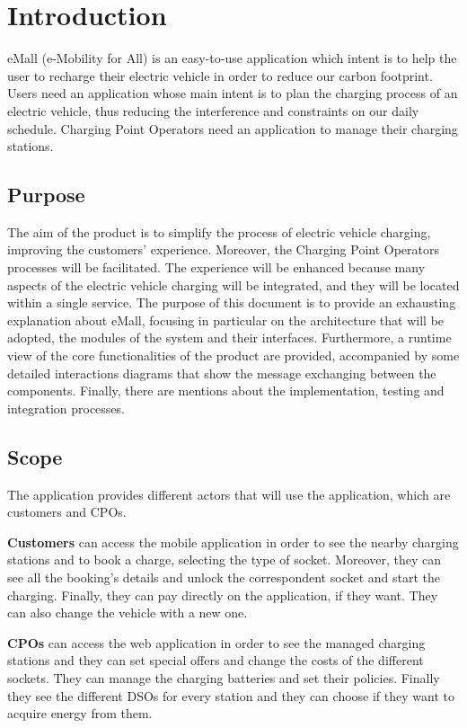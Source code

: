 \section{Introduction}
eMall (e-Mobility for All) is an easy-to-use application which intent is to help the user to recharge their electric vehicle in order to reduce our carbon footprint. Users need an application whose main intent is to plan the charging process of an electric vehicle, thus reducing the interference and constraints on our daily schedule. Charging Point Operators need an application to manage their charging stations.
\subsection{Purpose}
The aim of the product is to simplify the process of electric vehicle charging, improving the customers’ experience. Moreover, the Charging Point Operators processes will be facilitated. The experience will be enhanced because many aspects of the electric vehicle charging will be integrated, and they will be located within a single service.\newline
The purpose of this document is to provide an exhausting explanation about eMall, focusing in particular on the architecture that will be adopted, the modules of the system and their interfaces.
Furthermore, a runtime view of the core functionalities of the product are provided, accompanied by some detailed interactions diagrams that show the message exchanging between the components.
Finally, there are mentions about the implementation, testing and integration processes.
\subsection{Scope}
The application provides different actors that will use the application, which are customers and CPOs.

\textbf{Customers} can access the mobile application in order to see the nearby charging stations and to book a charge, selecting the type of socket. Moreover, they can see all the booking's details and unlock the correspondent socket and start the charging.  Finally, they can pay directly on the application, if they want.
They can also change the vehicle with a new one.

\textbf{CPOs} can access the web application in order to see the managed charging stations and they can set special offers and change the costs of the different sockets. They can manage the charging batteries and set their policies. Finally they see the different DSOs for every station and they can choose if they want to acquire energy from them.


